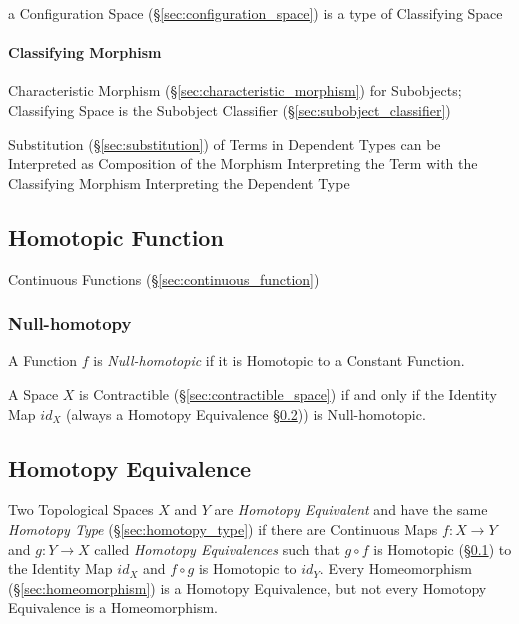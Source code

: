 a Configuration Space (\S\ref{sec:configuration_space}) is a type of
Classifying Space



\paragraph{Classifying Morphism}\label{sec:classifying_morphism}\hfill

Characteristic Morphism (\S\ref{sec:characteristic_morphism}) for
Subobjects; Classifying Space is the Subobject Classifier
(\S\ref{sec:subobject_classifier})

Substitution (\S\ref{sec:substitution}) of Terms in Dependent Types
can be Interpreted as Composition of the Morphism Interpreting the
Term with the Classifying Morphism Interpreting the Dependent Type



\subsection{Homotopic Function}\label{sec:homotopic_function}

Continuous Functions (\S\ref{sec:continuous_function})



\subsubsection{Null-homotopy}\label{sec:null_homotopy}

A Function $f$ is \emph{Null-homotopic} if it is Homotopic to a
Constant Function.

A Space $X$ is Contractible (\S\ref{sec:contractible_space}) if and
only if the Identity Map $id_X$ (always a Homotopy Equivalence
\S\ref{sec:homotopy_equivalence})) is Null-homotopic.



\subsection{Homotopy Equivalence}\label{sec:homotopy_equivalence}

Two Topological Spaces $X$ and $Y$ are \emph{Homotopy Equivalent} and
have the same \emph{Homotopy Type} (\S\ref{sec:homotopy_type}) if
there are Continuous Maps $f : X \rightarrow Y$ and $g : Y \rightarrow
X$ called \emph{Homotopy Equivalences} such that $g \circ f$ is
Homotopic (\S\ref{sec:homotopic_function}) to the Identity Map $id_X$
and $f \circ g$ is Homotopic to $id_Y$. Every Homeomorphism
(\S\ref{sec:homeomorphism}) is a Homotopy Equivalence, but not every
Homotopy Equivalence is a Homeomorphism.

